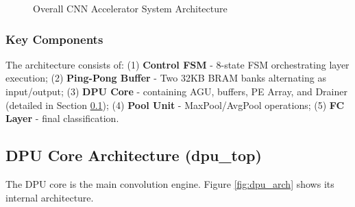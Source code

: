 \documentclass[11pt,a4paper]{article}
\begin{document}
\begin{figure}[H]
\caption{Overall CNN Accelerator System Architecture}
\label{fig:overall_arch}
\end{figure}

\subsubsection{Key Components}
The architecture consists of: (1) \textbf{Control FSM} - 8-state FSM orchestrating layer execution; (2) \textbf{Ping-Pong Buffer} - Two 32KB BRAM banks alternating as input/output; (3) \textbf{DPU Core} - containing AGU, buffers, PE Array, and Drainer (detailed in Section \ref{sec:dpu_arch}); (4) \textbf{Pool Unit} - MaxPool/AvgPool operations; (5) \textbf{FC Layer} - final classification.

\subsection{DPU Core Architecture (dpu\_top)}
\label{sec:dpu_arch}

The DPU core is the main convolution engine. Figure \ref{fig:dpu_arch} shows its internal architecture.
\end{document}
